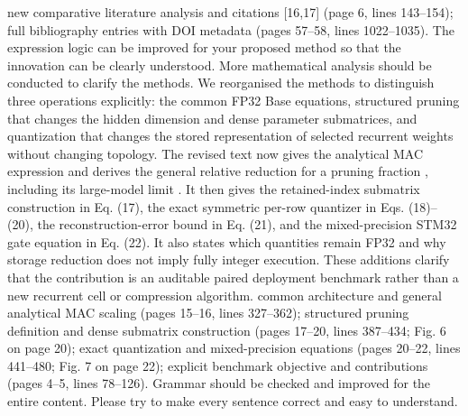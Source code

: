 {} new comparative literature analysis and citations [16,17] (page 6, lines 143--154); full bibliography entries with DOI metadata (pages 57--58, lines 1022--1035).\markdownRendererInterblockSeparator
{}
\markdownRendererSectionEnd \markdownRendererSectionBegin
{}\markdownRendererInterblockSeparator
{}\markdownRendererBlockQuoteBegin
The expression logic can be improved for your proposed method so that the innovation can be clearly understood. More mathematical analysis should be conducted to clarify the methods.\markdownRendererBlockQuoteEnd \markdownRendererInterblockSeparator
{} We reorganised the methods to distinguish three operations explicitly: the common FP32 Base equations, structured pruning that changes the hidden dimension and dense parameter submatrices, and quantization that changes the stored representation of selected recurrent weights without changing topology. The revised text now gives the analytical MAC expression and derives the general relative reduction for a pruning fraction , including its large-model limit . It then gives the retained-index submatrix construction in Eq. (17), the exact symmetric per-row quantizer in Eqs. (18)--(20), the reconstruction-error bound in Eq. (21), and the mixed-precision STM32 gate equation in Eq. (22). It also states which quantities remain FP32 and why storage reduction does not imply fully integer execution. These additions clarify that the contribution is an auditable paired deployment benchmark rather than a new recurrent cell or compression algorithm.\markdownRendererParagraphSeparator
{} common architecture and general analytical MAC scaling (pages 15--16, lines 327--362); structured pruning definition and dense submatrix construction (pages 17--20, lines 387--434; Fig. 6 on page 20); exact quantization and mixed-precision equations (pages 20--22, lines 441--480; Fig. 7 on page 22); explicit benchmark objective and contributions (pages 4--5, lines 78--126).\markdownRendererInterblockSeparator
{}
\markdownRendererSectionEnd \markdownRendererSectionBegin
{}\markdownRendererInterblockSeparator
{}\markdownRendererBlockQuoteBegin
Grammar should be checked and improved for the entire content. Please try to make every sentence correct and easy to understand.\markdownRendererBlockQuoteEnd \markdownRendererInterblockSeparator
